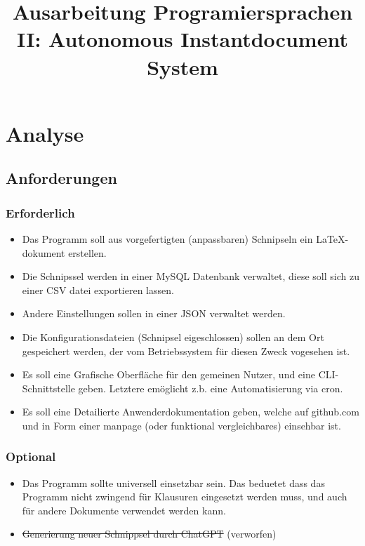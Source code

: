 \documentclass[stu, a4paper, 11pt, floatsintext]{apa7}
\title{Ausarbeitung Programiersprachen II: Autonomous Instantdocument System}
\affiliation{Technische Hochschule Ostwestfahlen-Lippe}
\begin{document}
\maketitle
\tableofcontents
\clearpage
\listoffigures
\clearpage
\listoftables
\clearpage

\section{Analyse}
\subsection{Anforderungen}

\subsubsection{Erforderlich}

\begin{itemize}
\item Das Programm soll aus vorgefertigten (anpassbaren) Schnipseln ein \LaTeX{}-dokument erstellen.
\item Die Schnipssel werden in einer MySQL Datenbank verwaltet, diese soll sich zu einer CSV datei exportieren lassen.
\item Andere Einstellungen sollen in einer JSON verwaltet werden.
\item Die Konfigurationsdateien (Schnipsel eigeschlossen) sollen an dem Ort gespeichert werden, der vom Betriebssystem für diesen Zweck vogesehen ist.
\item Es soll eine Grafische Oberfläche für den gemeinen Nutzer, und eine CLI-Schnittstelle geben. Letztere emöglicht z.b. eine Automatisierung via cron.
\item Es soll eine Detailierte Anwenderdokumentation geben, welche auf github.com und in Form einer manpage (oder funktional vergleichbares) einsehbar ist.
\end{itemize}

\subsubsection{Optional}

\begin{itemize}
\item Das Programm sollte universell einsetzbar sein.
Das beduetet dass das Programm nicht zwingend für Klausuren eingesetzt werden muss, und auch für andere Dokumente verwendet werden kann.
\item \sout{Generierung neuer Schnippsel durch ChatGPT} (verworfen)
\end{itemize}
\end{document}
